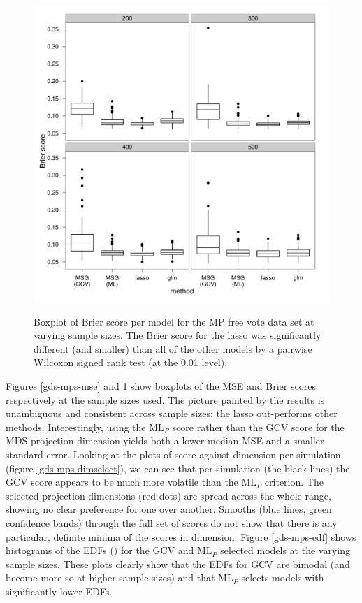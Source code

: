 \begin{figure}
\centering
\includegraphics[width=6in]{gds/figs/mp-brier.pdf} \\
\caption{Boxplot of Brier score per model for the MP free vote data set at varying sample sizes. The Brier score for the lasso was significantly different (and smaller) than all of the other models by a pairwise Wilcoxon signed rank test (at the 0.01 level).}
\label{gds-mps-brier}
\end{figure}

Figures \ref{gds-mps-mse} and \ref{gds-mps-brier} show boxplots of the MSE and Brier scores respectively at the sample sizes used. The picture painted by the results is unambiguous and consistent across sample sizes: the lasso out-performs other methods. Interestingly, using the $\text{ML}_P$ score rather than the GCV score for the MDS projection dimension yields both a lower median MSE and a smaller standard error. Looking at the plots of score against dimension per simulation (figure \ref{gds-mps-dimselect}), we can see that per simulation (the black lines) the GCV score appears to be much more volatile than the $\text{ML}_P$ criterion. The selected projection dimensions (red dots) are spread across the whole range, showing no clear preference for one over another. Smooths (blue lines, green confidence bands) through the full set of scores do not show that there is any particular, definite minima of the scores in dimension. Figure \ref{gds-mps-edf} shows histograms of the EDFs () for the GCV and $\text{ML}_P$ selected models at the varying sample sizes. These plots clearly show that the EDFs for GCV are bimodal (and become more so at higher sample sizes) and that $\text{ML}_P$ selects models with significantly lower EDFs.

